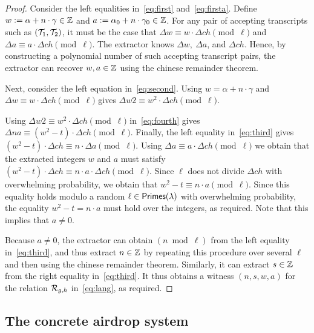 \documentclass[11pt]{article}
\begin{document}
\begin{proof}
Consider the left equalities in~\eqref{eq:first} and~\eqref{eq:firsta}.
Define $w \mathrel{\mathop:}= \alpha + n \cdot \gamma \in \mathbb Z$ 
and $a \mathrel{\mathop:}= \alpha_0 + n \cdot \gamma_0 \in \mathbb Z$.
For any pair of accepting transcripts such as $({\cal T}_1, {\cal T}_2)$,
it must be the case that 
$\Delta w \equiv w \cdot \Delta \mathit{ch} \pmod{\ell}$ and
$\Delta a \equiv a \cdot \Delta \mathit{ch} \pmod{\ell}$. 
The extractor knows $\Delta w,\ \Delta a$, and $\Delta \mathit{ch}$.
Hence, by constructing a polynomial number of such accepting transcript pairs, 
the extractor can recover $w, a \in \mathbb Z$ using the chinese remainder theorem. 

Next, consider the left equation in~\eqref{eq:second}.
Using $w = \alpha + n \cdot \gamma$ and
$\Delta w \equiv w \cdot \Delta \mathit{ch} \pmod{\ell}$ gives
$\Delta \mathit{w2} \equiv w^2 \cdot \Delta \mathit{ch} \pmod{\ell}$.

Using $\Delta \mathit{w2} \equiv w^2 \cdot \Delta \mathit{ch} \pmod{\ell}$
in~\eqref{eq:fourth}
gives $\Delta \mathit{na} \equiv (w^2 - t) \cdot \Delta \mathit{ch} \pmod{\ell}$. 
Finally, the left equality in~\eqref{eq:third} 
gives $(w^2 - t)\cdot \Delta \mathit{ch} \equiv n \cdot \Delta a \pmod{\ell}$.
Using $\Delta a \equiv a \cdot \Delta \mathit{ch} \pmod{\ell}$
we obtain that the extracted integers $w$ and $a$ must satisfy
$(w^2 - t)\cdot \Delta \mathit{ch} \equiv 
      n \cdot a \cdot \Delta \mathit{ch} \pmod{\ell}$.  
Since $\ell$ does not divide $\Delta \mathit{ch}$ with overwhelming
probability, we obtain that $w^2 - t \equiv n \cdot a \pmod{\ell}$.
Since this equality holds modulo a random $\ell \in \textsf{Primes}(\lambda)$ 
with overwhelming probability, 
the equality $w^2 - t = n \cdot a$ must hold over the integers,
as required.   Note that this implies that $a \neq 0$. 

Because $a \neq 0$, the extractor can obtain $(n \bmod \ell)$
from the left equality in~\eqref{eq:third}, and thus extract $n \in \mathbb Z$ by
repeating this procedure over several $\ell$ and then using the chinese
remainder theorem.  
Similarly, it can extract $s \in \mathbb Z$ from
the right equality in~\eqref{eq:third}.   
It thus obtains a witness $(n, s, w, a)$ 
for the relation ${\cal R}_{g,h}$ in~\eqref{eq:lang}, as required.
\end{proof}




\subsection{The concrete airdrop system}
\end{document}
